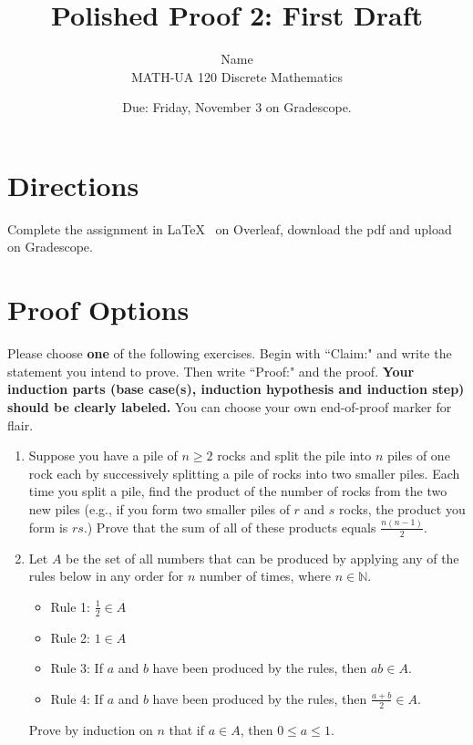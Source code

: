 \documentclass{article}
\title{Polished Proof 2: First Draft}
\author{%
	Name
	\\
	MATH-UA 120 Discrete Mathematics
}
\date{Due: Friday, November 3 on Gradescope.}
\theoremstyle{definition}
\begin{document}
	\maketitle
	
	\section*{Directions}

Complete the assignment in \LaTeX~  on Overleaf, download the pdf and upload on Gradescope.


\section*{Proof Options}

Please choose \textbf{one} of the following exercises. Begin with ``Claim:" and write the statement you intend to prove. Then write ``Proof:" and the proof. \textbf{Your induction parts (base case(s), induction hypothesis and induction step) should be clearly labeled.} You can choose your own end-of-proof marker for flair.

\begin{enumerate}
	\item 
    Suppose you have a pile of $n\geq 2$ rocks and split the pile into $n$ piles of one rock each by successively splitting a pile of rocks into two smaller piles. Each time you split a pile, find the product of the number of rocks from the two new piles (e.g., if you form two smaller piles of $r$ and $s$ rocks, the product you form is $rs$.) Prove that the sum of all of these products equals $\frac{n(n-1)}{2}$.
	\item Let $A$ be the set of all numbers that can be produced by applying any of the rules below in any order for $n$ number of times, where $n\in \mathbb{N}$.
    \begin{itemize}
    \item Rule 1: $\frac{1}{2}\in A$
    \item Rule 2: $1\in A$
    \item Rule 3: If $a$ and $b$ have been produced by the rules, then $ab\in A$.
    \item Rule 4: If $a$ and $b$ have been produced by the rules, then $\frac{a+b}{2}\in A$.
    \end{itemize}
    Prove by induction on $n$ that if $a\in A$, then $0\leq a\leq 1$.

\end{enumerate}
\end{document}
